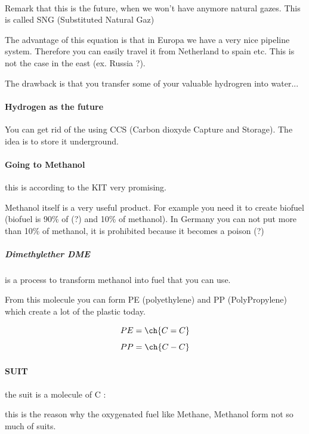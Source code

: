 \documentclass[10pt,a4paper]{article}
\begin{document}
\paragraph{}


Remark that this is the future, when we won't have anymore natural gazes. This is called SNG (Substituted Natural Gaz)


The advantage of this equation is that in Europa we have a very nice pipeline system. Therefore you can easily travel it from Netherland to spain etc. This is not the case in the east (ex. Russia ?).

The drawback is that you transfer some of your valuable hydrogren into water...

\paragraph{Hydrogen as the future} 

You can get rid of the  using CCS (Carbon dioxyde Capture and Storage). The idea is to store it underground.

\paragraph{Going to Methanol} this is according to the KIT very promising.

Methanol itself is a very useful product. For example you need it to create biofuel (biofuel is 90\% of (?) and 10\% of methanol). In Germany you can not put more than 10\% of methanol, it is prohibited because it becomes a poison (?)

\subparagraph{Dimethylether DME} is a process to transform methanol into fuel that you can use.


From this molecule you can form PE (polyethylene) and PP (PolyPropylene) which create a lot of the plastic today.

$$ PE = \ch{C = C} $$
$$ PP = \ch{C-C} $$

\paragraph{SUIT} the suit is a molecule of C :


this is the reason why the oxygenated fuel like Methane, Methanol form not so much of suits. 
\end{document}
